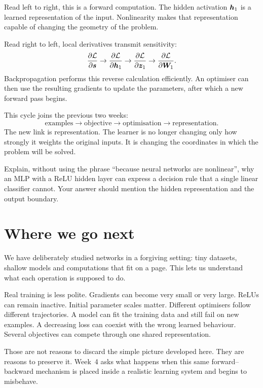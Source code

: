 Read left to right, this is a forward computation. The hidden activation \(\bm{h}_1\) is a learned representation of the input. Nonlinearity makes that representation capable of changing the geometry of the problem.

Read right to left, local derivatives transmit sensitivity:
\[
\frac{\partial\mathcal{L}}{\partial\bm{s}}
\rightarrow
\frac{\partial\mathcal{L}}{\partial\bm{h}_1}
\rightarrow
\frac{\partial\mathcal{L}}{\partial\bm{z}_1}
\rightarrow
\frac{\partial\mathcal{L}}{\partial\bm{W}_1}.
\]
Backpropagation performs this reverse calculation efficiently. An optimiser can then use the resulting gradients to update the parameters, after which a new forward pass begins.

This cycle joins the previous two weeks:
\[
\text{examples}
\rightarrow
\text{objective}
\rightarrow
\text{optimisation}
\rightarrow
\text{representation}.
\]
The new link is representation. The learner is no longer changing only how strongly it weights the original inputs. It is changing the coordinates in which the problem will be solved.

\begin{checkpointbox}
Explain, without using the phrase ``because neural networks are nonlinear'', why an MLP with a ReLU hidden layer can express a decision rule that a single linear classifier cannot. Your answer should mention the hidden representation and the output boundary.
\end{checkpointbox}

\section{Where we go next}

We have deliberately studied networks in a forgiving setting: tiny datasets, shallow models and computations that fit on a page. This lets us understand what each operation is supposed to do.

Real training is less polite. Gradients can become very small or very large. ReLUs can remain inactive. Initial parameter scales matter. Different optimisers follow different trajectories. A model can fit the training data and still fail on new examples. A decreasing loss can coexist with the wrong learned behaviour. Several objectives can compete through one shared representation.

Those are not reasons to discard the simple picture developed here. They are reasons to preserve it. Week~4 asks what happens when this same forward--backward mechanism is placed inside a realistic learning system and begins to misbehave.
